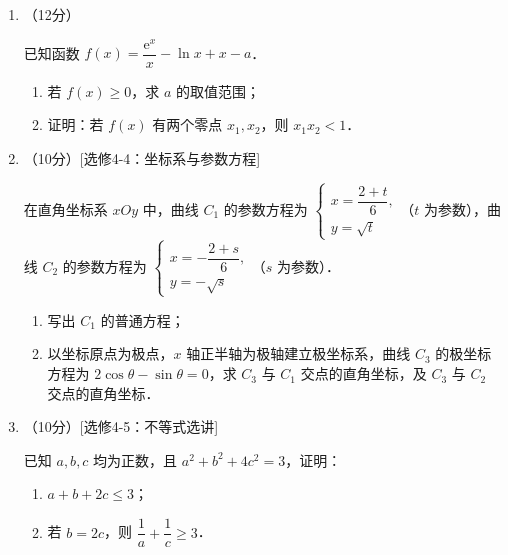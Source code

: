 \begin{description}
\begin{enumerate}[leftmargin=5pt]
        设抛物线 $C:y^2=2px\,(p>0)$ 的焦点为 $F$，点 $D(p,0)$，过 $F$ 的直线交 $C$ 于 $M,N$ 两点．当直线 $MD$ 垂直于 $x$ 轴时，$|MF|=3$．

        \begin{enumerate}[label=(\arabic*)]
            \item 求 $C$ 的方程；
            \item 设直线 $MD,ND$ 与 $C$ 的另一个交点分别为 $A,B$，记直线 $MN,AB$ 的倾斜角分别为 $\alpha,\beta$．当 $\alpha-\beta$ 取得最大值时，求直线 $AB$ 的方程．
        \end{enumerate}

        \item （12分）

        已知函数 $f(x)=\dfrac{\mathrm{e}^x}{x}-\ln x+x-a$．

        \begin{enumerate}[label=(\arabic*)]
            \item 若 $f(x)\geqslant0$，求 $a$ 的取值范围；
            \item 证明：若 $f(x)$ 有两个零点 $x_1,x_2$，则 $x_1x_2<1$．
        \end{enumerate}

        \item （10分）[选修4-4：坐标系与参数方程]

        在直角坐标系 $xOy$ 中，曲线 $C_1$ 的参数方程为 $\begin{cases}x=\dfrac{2+t}{6},\\y=\sqrt{t}\end{cases}$（$t$ 为参数），曲线 $C_2$ 的参数方程为 $\begin{cases}x=-\dfrac{2+s}{6},\\y=-\sqrt{s}\end{cases}$（$s$ 为参数）．

        \begin{enumerate}[label=(\arabic*)]
            \item 写出 $C_1$ 的普通方程；
            \item 以坐标原点为极点，$x$ 轴正半轴为极轴建立极坐标系，曲线 $C_3$ 的极坐标方程为 $2\cos\theta-\sin\theta=0$，求 $C_3$ 与 $C_1$ 交点的直角坐标，及 $C_3$ 与 $C_2$ 交点的直角坐标．
        \end{enumerate}

        \item （10分）[选修4-5：不等式选讲]

        已知 $a,b,c$ 均为正数，且 $a^2+b^2+4c^2=3$，证明：

        \begin{enumerate}[label=(\arabic*)]
            \item $a+b+2c\leqslant3$；
            \item 若 $b=2c$，则 $\dfrac{1}{a}+\dfrac{1}{c}\geqslant3$．
        \end{enumerate}
    \end{enumerate}
\end{description}
\clearpage


